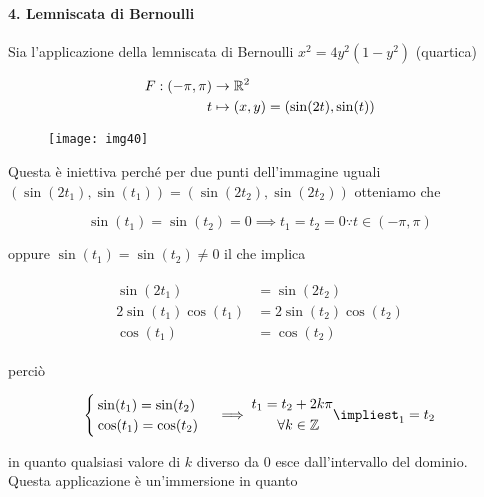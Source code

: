 \paragraph{4. Lemniscata di Bernoulli}

Sia l'applicazione della lemniscata di Bernoulli $ x^{2} = 4 y^{2} (1-y^{2}) $ (quartica)

\begin{align}
	\begin{split}
		F : (-\pi,\pi) &\to \mathbb{R}^{2}\\
		t &\mapsto (x,y) = (\sin(2t),\sin(t))
	\end{split}
\end{align}

\begin{figure}[H]
	\centering
	\texttt{[image: img40]}
\end{figure}

Questa è iniettiva perché per due punti dell'immagine uguali $ (\sin(2t_{1}),\sin(t_{1})) = (\sin(2t_{2}),\sin(2t_{2})) $ otteniamo che

\begin{equation}
	\sin(t_{1}) = \sin(t_{2}) = 0 \implies t_{1} = t_{2} = 0 \because t \in (-\pi,\pi)
\end{equation}

oppure $ \sin(t_{1}) = \sin(t_{2}) \neq 0 $ il che implica

\begin{align}
	\begin{split}
		\sin(2t_{1}) &= \sin(2t_{2})\\
		2 \sin(t_{1}) \cos(t_{1}) &= 2 \sin(t_{2}) \cos(t_{2})\\
		\cos(t_{1}) &= \cos(t_{2})
	\end{split}		
\end{align}

perciò

\begin{equation}
	\begin{cases}
		\sin(t_{1}) = \sin(t_{2})\\
		\cos(t_{1}) = \cos(t_{2})
	\end{cases}%
	\implies%
	\begin{aligned}
		t_{1} = t_{2} &+ 2 k \pi\\
		\forall k &\in \Z
	\end{aligned}
	\implies%
	t_{1} = t_{2}
\end{equation}

in quanto qualsiasi valore di $ k $ diverso da 0 esce dall'intervallo del dominio.\\
Questa applicazione è un'immersione in quanto

